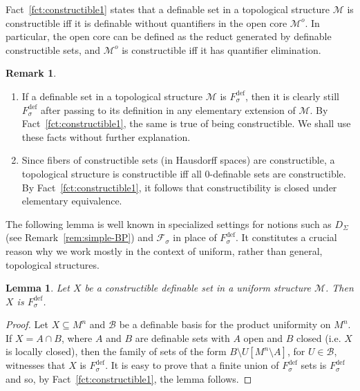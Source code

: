 \documentclass[12pt]{article}
\newcommand{\Bb}{\mathcal{B}}
\newcommand{\Mm}{\mathcal{M}}
\newcommand{\Ff}{\mathcal{F}}
\newcommand{\dF}{\ensuremath{F_\sigma^{\text{def}}}}
\newcommand{\dG}{\ensuremath{G_\delta^{\text{def}}}}
\newcommand{\BU}{\Bb} %
\newcommand{\Mo}{\Mm^o}%
\newtheorem{lemma}[theorem]{Lemma}
\theoremstyle{definition}
\newtheorem{remark}[theorem]{Remark}
\theoremstyle{remark}
\begin{document}
Fact~\ref{fct:constructible1} states that a definable set in a topological structure $\Mm$ is constructible iff it is definable without quantifiers in the open core $\Mo$. In particular, the open core can be defined as the reduct generated by definable constructible sets, and $\Mo$ is constructible iff it has quantifier elimination. 

\begin{remark}\label{rem:extensions}
\begin{enumerate}
\item If a definable set in a topological structure $\Mm$ is $\dF$, then it is clearly still $\dF$ after passing to its definition in any elementary extension of $\Mm$. By Fact~\ref{fct:constructible1}, the same is true of being constructible. We shall use these facts without further explanation. 

\item Since fibers of constructible sets (in Hausdorff spaces) are constructible, a topological structure is constructible iff all $0$-definable sets are constructible. By Fact~\ref{fct:constructible1}, it follows that constructibility is closed under elementary equivalence. 
\end{enumerate}
\end{remark}

The following lemma is well known in specialized settings for notions such as $D_\Sigma$ (see Remark~\ref{rem:simple-BP}) and $\Ff_\sigma$ in place of $\dF$. It constitutes a crucial reason why we work mostly in the context of uniform, rather than general, topological structures. 

\begin{lemma}\label{lem:cons-dF}
Let $X$ be a constructible definable set in a uniform structure $\Mm$. Then $X$ is $\dF$. 
\end{lemma}
\begin{proof}
Let $X\subseteq M^n$ and $\BU$ be a definable basis for the product uniformity on $M^n$. If $X=A\cap B$, where $A$ and $B$ are definable sets with $A$ open and $B$ closed (i.e. $X$ is locally closed), then the family of sets of the form $B \setminus U[M^n\setminus A]$, for $U\in \BU$, witnesses that $X$ is $\dF$. It is easy to prove that a finite union of $\dF$ sets is $\dF$ and so, by Fact~\ref{fct:constructible1}, the lemma follows.  
\end{proof}

\end{document}
